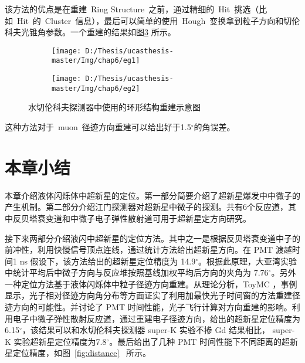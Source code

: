 该方法的优点是在重建~Ring Structure~之前，通过精细的~Hit~挑选（比如~Hit~的~Cluster~信息），最后可以简单的使用~Hough~变换拿到粒子方向和切伦科夫光锥角参数。一个重建的结果如图\ref{fig:p62} 所示。
\begin{figure}[!htb]
  \centering
  \begin{subfigure}[b]{\MySubFactor\textwidth}
    \texttt{[image: D:/Thesis/ucasthesis-master/Img/chap6/eg1]}
    \caption{}
    \label{fig:p62_1}
  \end{subfigure}%
  \quad\quad%
  \begin{subfigure}[b]{\MySubFactor\textwidth}
    \texttt{[image: D:/Thesis/ucasthesis-master/Img/chap6/eg2]}
    \caption{}
    \label{fig:p62_2}
  \end{subfigure}
  \caption{水切伦科夫探测器中使用的环形结构重建示意图}
  \label{fig:p62}
\end{figure}
这种方法对于~muon~径迹方向重建可以给出好于1.5$^\circ$的角误差。
\section{本章小结}
本章介绍液体闪烁体中超新星的定位。第一部分简要介绍了超新星爆发中中微子的产生机制。第二部分介绍江门探测器对超新星中微子的探测。共有6个反应道，其中反贝塔衰变道和中微子电子弹性散射道可用于超新星定方向研究。

接下来两部分介绍液闪中超新星的定位方法。其中之一是根据反贝塔衰变道中子的前冲性，利用快慢信号顶点连线，通过统计方法给出超新星方向。在 PMT 渡越时间1 ns 假设下，该方法给出的超新星定位精度为 14.9$^\circ$。根据此原理，大亚湾实验中统计平均后中微子方向与反应堆按照基线加权平均后方向的夹角为 7.76$^\circ$。另外一种定位方法基于液体闪烁体中粒子径迹方向重建。从理论分析，ToyMC ，事例显示，光子相对径迹方向角分布等方面证实了利用加最快光子时间窗的方法重建径迹方向的可能性。并讨论了 PMT 时间性能，光子飞行计算对方向重建的影响。利用电子中微子弹性散射反应道，通过重建电子径迹方向，给出的超新星定位精度为6.15$^\circ$，该结果可以和水切伦科夫探测器 super-K 实验不掺 Gd 结果相比， super-K 实验超新星定位精度为7.8$^\circ$。最后给出了几种 PMT 时间性能下不同距离的超新星定位精度，如图~\ref{fig:distance}~ 所示。
